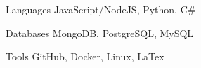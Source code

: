 

\begin{cvskills}

  \cvskill
    {Languages} %
    {JavaScript/NodeJS, Python, C\#} %

  \cvskill
    {Databases} %
    {MongoDB, PostgreSQL, MySQL} %


  \cvskill
    {Tools} %
    {GitHub, Docker, Linux, LaTex} %

\end{cvskills}

